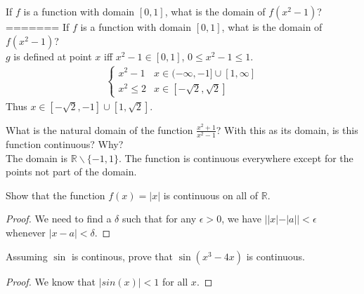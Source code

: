 \documentclass[12pt]{book}
\newcommand{\R}{\mathbb{R}}
\newenvironment{exercise}[2][Exercise]{\begin{trivlist}
\item[\hskip \labelsep {\bfseries #1}\hskip \labelsep {\bfseries #2.}]}{\end{trivlist}}
\begin{document}
\begin{exercise}{3.1.1}
If $f$ is a function with domain $[0,1]$, what is the domain of $f(x^2-1)$?\\
=======
    If $f$ is a function with domain $[0,1]$, what is the domain of $f(x^2 -1)$? \\
    
    $g$ is defined at point $x$ iff $x^2-1 \in [0,1]$, $0 \leq x^2-1 \leq 1$.
    \begin{align*}
        \begin{cases}
            x^2-1 & x\in (-\infty,-1] \cup [1,\infty] \\
            x^2 \leq 2 & x \in [-\sqrt{2},\sqrt{2}]
         \end{cases}
    \end{align*}
    Thus $x \in [-\sqrt{2},-1] \cup [1,\sqrt{2}]$.
\end{exercise}

\begin{exercise}{3.1.2}
What is the natural domain of the function $\frac{x^2 +1}{x^2-1}$? With this as its domain, is this function continuous? Why? \\

The domain is $\R \backslash \{-1,1\}$. The function is continuous everywhere except for the points not part of the domain.
\end{exercise}

\begin{exercise}{3.1.4}
Show that the function $f(x) = |x|$ is continuous on all of $\R$.

	\begin{proof}
	We need to find a $\delta$ such that for any $\epsilon > 0$, we have $||x| - |a|| < \epsilon$ whenever $|x-a|< \delta$.
	\end{proof}
\end{exercise}

\begin{exercise}{3.1.5}
Assuming $\sin$ is continous, prove that $\sin(x^3-4x)$ is continuous.

	\begin{proof}
	We know that $|sin(x)| < 1$ for all $x$.  
	\end{proof}
\end{exercise}
\end{document}
